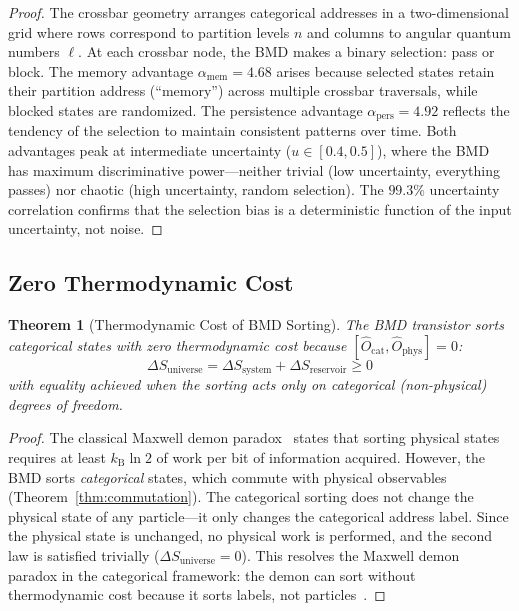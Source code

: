 \documentclass[12pt]{article}
\newtheorem{theorem}{Theorem}[section]
\theoremstyle{definition}
\theoremstyle{remark}
\newcommand{\Ocat}{\hat{O}_{\mathrm{cat}}}
\newcommand{\Ophys}{\hat{O}_{\mathrm{phys}}}
\newcommand{\kB}{k_{\mathrm{B}}}
\begin{document}
\begin{proof}
The crossbar geometry arranges categorical addresses in a two-dimensional grid where rows correspond to partition levels $n$ and columns to angular quantum numbers $\ell$. At each crossbar node, the BMD makes a binary selection: pass or block. The memory advantage $\alpha_{\mathrm{mem}} = 4.68$ arises because selected states retain their partition address (``memory'') across multiple crossbar traversals, while blocked states are randomized. The persistence advantage $\alpha_{\mathrm{pers}} = 4.92$ reflects the tendency of the selection to maintain consistent patterns over time. Both advantages peak at intermediate uncertainty ($u \in [0.4, 0.5]$), where the BMD has maximum discriminative power---neither trivial (low uncertainty, everything passes) nor chaotic (high uncertainty, random selection). The $99.3\%$ uncertainty correlation confirms that the selection bias is a deterministic function of the input uncertainty, not noise. \qedhere
\end{proof}

\subsection{Zero Thermodynamic Cost}

\begin{theorem}[Thermodynamic Cost of BMD Sorting]
\label{thm:bmd_thermo}
The BMD transistor sorts categorical states with zero thermodynamic cost because $[\Ocat, \Ophys] = 0$:
\begin{equation}
\label{eq:zero_cost}
\Delta S_{\mathrm{universe}} = \Delta S_{\mathrm{system}} + \Delta S_{\mathrm{reservoir}} \geq 0
\end{equation}
with equality achieved when the sorting acts only on categorical (non-physical) degrees of freedom.
\end{theorem}

\begin{proof}
The classical Maxwell demon paradox~\citep{szilard1929entropieverminderung, leff1990maxwell, bennett1982thermodynamics} states that sorting physical states requires at least $\kB \ln 2$ of work per bit of information acquired. However, the BMD sorts \emph{categorical} states, which commute with physical observables (Theorem~\ref{thm:commutation}). The categorical sorting does not change the physical state of any particle---it only changes the categorical address label. Since the physical state is unchanged, no physical work is performed, and the second law is satisfied trivially ($\Delta S_{\mathrm{universe}} = 0$). This resolves the Maxwell demon paradox in the categorical framework: the demon can sort without thermodynamic cost because it sorts labels, not particles~\citep{sagawa2010generalized}. \qedhere
\end{proof}
\end{document}
